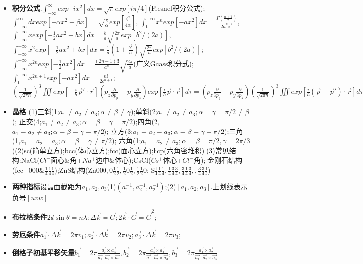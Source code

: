 \documentclass[UTF8,a4paper,1pt]{ctexart}
\begin{document}
\begin{itemize}
  \item \textbf{积分公式}.$\int_{-\infty}^{\infty}exp[ix^2]dx=\sqrt{\pi}exp[i\pi/4]$(Fresnel积分公式);
  $\int_{-\infty}^{\infty}dxexp[-\alpha x^2+\beta x]=\sqrt{\frac{\pi}{\alpha}}exp[\frac{\beta^2}{4\alpha}]$,
  $\int_{0}^{+\infty}x^{n}exp[-ax^{2}]dx=\frac{\Gamma(\frac{n+1}{2})}{2a^{\frac{n+1}{2}}}$,
  $\int_{-\infty}^{+\infty}xexp[-\frac{1}{2}ax^2+bx]dx=\frac{b}{a}\sqrt{\frac{2\pi}{a}}exp[b^2/(2a)]$,
  $\int_{-\infty}^{+\infty}x^{2}exp[-\frac{1}{2}ax^2+bx]dx=\frac{1}{a}(1+\frac{b^{2}}{a})\sqrt{\frac{2\pi}{a}}exp[b^{2}/(2a)]$;
  $\int_{-\infty}^{+\infty}x^{2n}exp[-\frac{1}{2}ax^{2}]dx=\frac{(2n-1)!!}{a^{n}}\sqrt{\frac{2\pi}{a}}$(广义Guass积分式);
  $\int_{0}^{+\infty}x^{2n+1}exp[-ax^{2}]dx=\frac{n!}{2a^{n+1}}$;
  $(\frac{1}{\sqrt{2\pi\hbar}})^{3}\iiint exp[-\frac{i}{\hbar}\vec{p}'\cdot\vec{r}](p_{z}\frac{\partial}{\partial p_{y}}-p_{y}\frac{\partial}{\partial p_{z}})exp[\frac{i}{\hbar}\vec{p}\cdot\vec{r}]d\tau=
  (p_{z}\frac{\partial}{\partial p_{y}}-p_{y}\frac{\partial}{\partial p_{z}})(\frac{1}{\sqrt{2\pi\hbar}})^{3}\iiint exp[\frac{i}{\hbar}(\vec{p}-\vec{p}')\cdot\vec{r}]d\tau
  =(p_{z}\frac{\partial}{\partial p_{y}}-p_{y}\frac{\partial}{\partial p_{z}})\delta(\vec{p}-\vec{p}')$

  \item \textbf{晶格}  (1)三斜(1;$a_1\neq a_2\neq a_3;\alpha\neq\beta\neq\gamma$);单斜(2;$a_1\neq a_2\neq a_3;\alpha=\gamma=\pi/2\neq\beta$);
  正交(4;$a_1\neq a_2\neq a_3;\alpha=\beta=\gamma=\pi/2$);四角(2,$a_1=a_2\neq a_3;\alpha=\beta=\gamma=\pi/2$);
  立方(3;$a_1=a_2=a_3;\alpha=\beta=\gamma=\pi/2$);三角(1,$a_1=a_2=a_3;\alpha=\beta=\gamma\neq\pi/2$);
  六角(1;$a_1=a_2\neq a_3;\alpha=\beta=\pi/2,\gamma=2\pi/3$)(2)sc(简单立方);bcc(体心立方);fcc(面心立方);hcp(六角密堆积)
  (3)常见结构:NaCl($Cl^{-}$面心\&角+$Na^{+}$边中\&体心);CsCl($Cs^{+}$体心+$Cl^{-}$角);
  金刚石结构(fcc+$000\&\frac{1}{4}\frac{1}{4}\frac{1}{4}$);ZnS结构(Zn$000,0\frac{1}{2}\frac{1}{2},\frac{1}{2}0\frac{1}{2},\frac{1}{2}\frac{1}{2}0$;
  S$\frac{1}{4}\frac{1}{4}\frac{1}{4},\frac{1}{4}\frac{3}{4}\frac{3}{4},\frac{3}{4}\frac{1}{4}\frac{3}{4},,\frac{3}{4}\frac{3}{4}\frac{1}{4}$)

  \item \textbf{两种指标}设晶面截距为$a_1,a_2,a_3$(1)$(a_1^{-1},a_{2}^{-1},a_2^{-1})$;(2)$[a_1,a_2,a_3]$.上划线表示负号$[u\overline{v}w]$
  \item \textbf{布拉格条件}$2d\sin{\theta}=n\lambda;\Delta\vec{k}=\vec{G};2\vec{k}\cdot\vec{G}=\vec{G}^2$;
  \item \textbf{劳厄条件}$\vec{a_1}\cdot\Delta\vec{k}=2\pi v_1;\vec{a_2}\cdot\Delta\vec{k}=2\pi v_2;\vec{a_3}\cdot\Delta\vec{k}=2\pi v_3$;
  \item \textbf{倒格子初基平移矢量}$\vec{b_1}=2\pi\frac{\vec{a_2}\times\vec{a_3}}{\vec{a_1}\cdot\vec{a_2}\times\vec{a_3}},
  \vec{b_2}=2\pi\frac{\vec{a_3}\times\vec{a_1}}{\vec{a_1}\cdot\vec{a_2}\times\vec{a_3}},
  \vec{b_3}=2\pi\frac{\vec{a_1}\times\vec{a_2}}{\vec{a_1}\cdot\vec{a_2}\times\vec{a_3}}$


\end{itemize}
\end{document}
